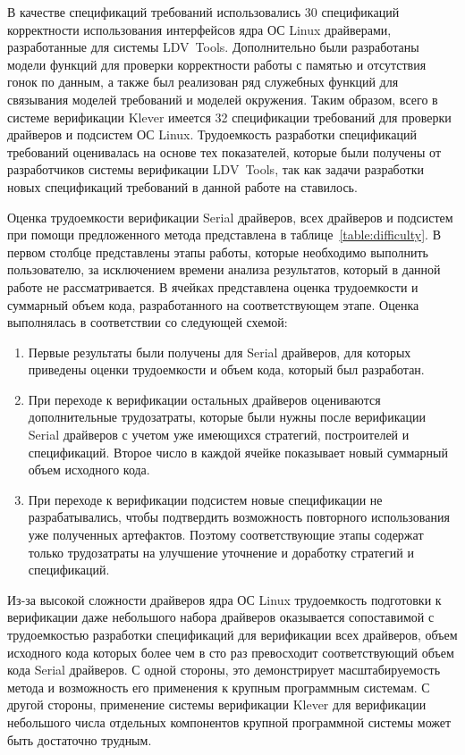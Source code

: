 В качестве спецификаций требований использовались 30 спецификаций корректности использования интерфейсов ядра ОС Linux драйверами, разработанные для системы LDV~Tools.
Дополнительно были разработаны модели функций для проверки корректности работы с памятью и отсутствия гонок по данным, а также был реализован ряд служебных функций для связывания моделей требований и моделей окружения.
Таким образом, всего в системе верификации Klever имеется 32 спецификации требований для проверки драйверов и подсистем ОС Linux.
Трудоемкость разработки спецификаций требований оценивалась на основе тех показателей, которые были получены от разработчиков системы верификации LDV~Tools, так как задачи разработки новых спецификаций требований в данной работе на ставилось.

Оценка трудоемкости верификации Serial драйверов, всех драйверов и подсистем при помощи предложенного метода представлена в таблице~\ref{table:difficulty}.
В первом столбце представлены этапы работы, которые необходимо выполнить пользователю, за исключением времени анализа результатов, который в данной работе не рассматривается.
В ячейках представлена оценка трудоемкости и суммарный объем кода, разработанного на соответствующем этапе.
Оценка выполнялась в соответствии со следующей схемой:
\begin{enumerate}
    \item Первые результаты были получены для Serial драйверов, для которых приведены оценки трудоемкости и объем кода, который был разработан.
    \item При переходе к верификации остальных драйверов оцениваются дополнительные трудозатраты, которые были нужны после верификации Serial драйверов с учетом уже имеющихся стратегий, построителей и спецификаций.
    Второе число в каждой ячейке показывает новый суммарный объем исходного кода.
    \item При переходе к верификации подсистем новые спецификации не разрабатывались, чтобы подтвердить возможность повторного использования уже полученных артефактов.
    Поэтому соответствующие этапы содержат только трудозатраты на улучшение уточнение и доработку стратегий и спецификаций.
\end{enumerate}

Из-за высокой сложности драйверов ядра ОС Linux трудоемкость подготовки к верификации даже небольшого набора драйверов оказывается сопоставимой с трудоемкостью разработки спецификаций для верификации всех драйверов, объем исходного кода которых более чем в сто раз превосходит соответствующий объем кода Serial драйверов. 
С одной стороны, это демонстрирует масштабируемость метода и возможность его применения к крупным программным системам.
С другой стороны, применение системы верификации Klever для верификации небольшого числа отдельных компонентов крупной программной системы может быть достаточно трудным. 


